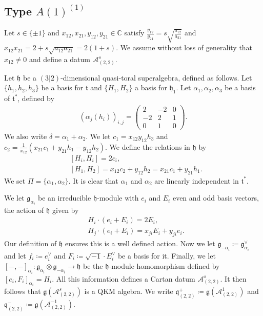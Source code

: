 \documentclass[12pt, a4paper, reqno]{amsart}
\def\ol{\overline}
\theoremstyle{definition}
\theoremstyle{definition}
\theoremstyle{definition}
\numberwithin{theorem}{section}
\numberwithin{lemma}{section}
\numberwithin{remark}{section}
\numberwithin{definition}{section}
\numberwithin{corollary}{section}
\numberwithin{proposition}{section}
\numberwithin{example}{section}
\begin{document}
	\subsection{Type \({A(1)}^{(1)}\)}\label{section_q_22}
	Let \(s \in \{\pm 1\}\) and \(x_{12},x_{21},y_{12},y_{21} \in \mathbb{C}\) satisfy \(\frac{y_{12}}{y_{21}} = s\sqrt{\frac{a_{12}}{a_{21}}}\) and \(x_{12}x_{21} = 2 + s\sqrt{a_{12}a_{21}}=2(1+s)\). We assume without loss of generality that \(x_{12}\neq 0\) and define a datum \(\mathcal{A}^{s}_{(2,2)}\). \par
	Let \(\mathfrak{h}\) be a \((3|2)\)-dimensional quasi-toral superalgebra, defined as follows. Let \(\{h_1,h_2,h_3\}\) be a basis for \(\mathfrak{t}\) and \(\{H_1,H_2\}\) a basis for \(\mathfrak{h}_{\ol{1}}\). Let \(\alpha_1,\alpha_2,\alpha_3\) be a basis of \(\mathfrak{t}^*\), defined by 
	\begin{align*}
		(\alpha_j(h_i))_{i,j} = \begin{pmatrix} 2 & -2 & 0 \\ -2 & 2 & 1 \\ 0 & 1 & 0 \end{pmatrix}.
	\end{align*}
	We also write \(\delta = \alpha_1+\alpha_2\). We let \(c_1 = x_{12}y_{12} h_3\) and \(c_2 = \frac{1}{x_{12}}(x_{21}c_1+y_{21}h_1 - y_{12}h_2)\). We define the relations in \(\mathfrak{h}\) by
	\begin{align*}
		&[H_i,H_i] = 2c_i, \\
		&[H_1,H_2] = x_{12}c_2+ y_{12}h_2 = x_{21}c_1 + y_{21}h_1.
	\end{align*}
	We set \(\Pi = \{\alpha_1,\alpha_2\}\). It is clear that \(\alpha_1\) and \(\alpha_2\) are linearly independent in \(\mathfrak{t}^*\). 
	
	We let \(\mathfrak{g}_{\alpha_i}\) be an irreducible \(\mathfrak{h}\)-module with \(e_i\) and \(E_i\) even and odd basis vectors, the action of \(\mathfrak{h}\) given by
	\begin{align*}
		& H_i\cdot(e_i+E_i) = 2E_i, \\
		& H_j\cdot (e_i+E_i) = x_{ji}E_i + y_{ji}e_i.
	\end{align*}
	Our definition of \(\mathfrak{h}\) ensures this is a well defined action. Now we let \(\mathfrak{g}_{-\alpha_i} \coloneq \mathfrak{g}_{\alpha_i}^{\vee}\) and let \(f_i \coloneq e_i^\vee\) and \(F_i \coloneq \sqrt{-1} \cdot E_i^\vee\) be a basis for it. Finally, we let \([-,-]_{\alpha_i}:\mathfrak{g}_{\alpha_i}\otimes \mathfrak{g}_{-\alpha_i} \rightarrow \mathfrak{h}\) be the \(\mathfrak{h}\)-module homomorphism defined by \([e_i,F_i]_{\alpha_i} = H_i\). All this information defines a Cartan datum \(\mathcal{A}_{(2,2)}^s\). It then follows that \(\mathfrak{g}(\mathcal{A}_{(2,2)}^s)\) is a QKM algebra. We write \(\mathfrak{q}^+_{(2,2)} \coloneq \mathfrak{g}(\mathcal{A}_{(2,2)}^{1})\) and \(\mathfrak{q}^-_{(2,2)} \coloneq \mathfrak{g}(\mathcal{A}_{(2,2)}^{-1})\). 
	
\end{document}
